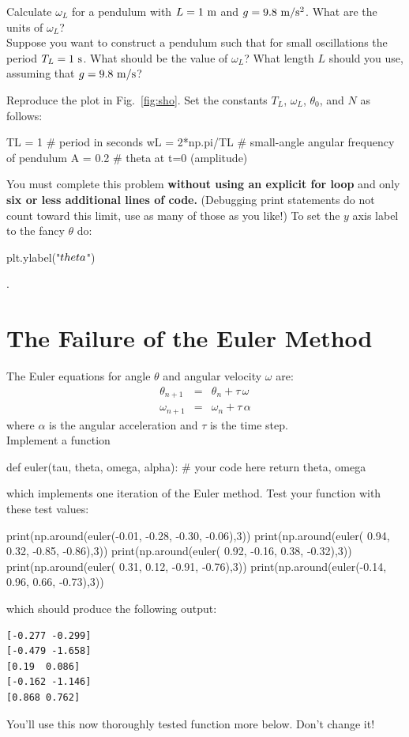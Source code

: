 \plot Calculate $\omega_L$ for a pendulum with $L=1~\rm m$ and $g=9.8~\rm m/s^2$.
What are the units of $\omega_L$?\\

\plot  Suppose you want to construct a pendulum such that for small
oscillations the period $T_L = 1~\rm s$.  What should be the value of
$\omega_L$?  What length $L$ should you use, assuming that $g=9.8~\rm
m/s$?\\

\newpage

\plot Reproduce the plot in Fig.~\ref{fig:sho}.  Set the
constants $T_L$, $\omega_L$, $\theta_0$, and $N$ as follows:
\begin{python}
TL = 1          # period in seconds 
wL = 2*np.pi/TL # small-angle angular frequency of pendulum 
A  = 0.2        # theta at t=0 (amplitude)
\end{python}
You must complete this problem {\bf without using an explicit for
  loop} and only {\bf six or less additional lines of code.}  (Debugging
print statements do not count toward this limit, use as many of those
as you like!)  To set the $y$ axis label to the fancy $\theta$ do:
\begin{python}
plt.ylabel("$\\theta$")
\end{python}.

\section{The Failure of the Euler Method}

The Euler equations for angle $\theta$ and angular velocity $\omega$ are:
\begin{eqnarray}
  \theta_{n+1} &=& \theta_n + \tau \, \omega \\
  \omega_{n+1} &=& \omega_n + \tau \, \alpha 
\end{eqnarray}
where $\alpha$ is the angular acceleration and $\tau$ is the time step.\\

\plot Implement a function
\begin{python}
def euler(tau, theta, omega, alpha):
   # your code here
   return theta, omega
\end{python}
which implements one iteration of the Euler method.
Test your  function with these test values:
\begin{python}
print(np.around(euler(-0.01, -0.28, -0.30, -0.06),3))
print(np.around(euler( 0.94,  0.32, -0.85, -0.86),3))
print(np.around(euler( 0.92, -0.16,  0.38, -0.32),3))
print(np.around(euler( 0.31,  0.12, -0.91, -0.76),3))
print(np.around(euler(-0.14,  0.96,  0.66, -0.73),3))
\end{python}
which should produce the following output:
\begin{verbatim}
[-0.277 -0.299]
[-0.479 -1.658]
[0.19  0.086]
[-0.162 -1.146]
[0.868 0.762]
\end{verbatim}
You'll use this now thoroughly tested function more below.  Don't change it!\\

